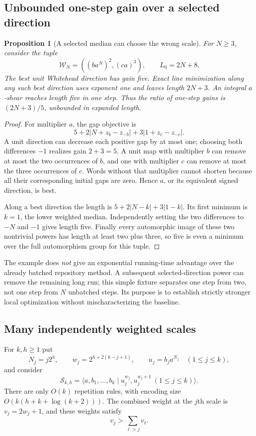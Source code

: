 \documentclass[11pt,letterpaper]{article}
\newtheorem{proposition}[theorem]{Proposition}
\theoremstyle{definition}
\theoremstyle{remark}\newtheorem{remark}[theorem]{Remark}
\newcommand{\calW}{\mathcal W}
\newcommand{\calS}{\mathcal S}
\begin{document}
\subsection{Unbounded one-step gain over a selected direction}

\begin{proposition}[A selected median can choose the wrong scale]
For $N\ge3$, consider the tuple
\[
 \calW_N=((ba^N)^2,(ca)^3),\qquad L_0=2N+8.
\]
The best unit Whitehead direction has gain five. Exact line minimization
along any such best direction uses exponent one and leaves length $2N+3$.
An integral $a$-shear reaches length five in one step. Thus the ratio of
one-step gains is $(2N+3)/5$, unbounded in expanded length.
\end{proposition}
\begin{proof}
For multiplier $a$, the gap objective is
\[
 5+2|N+z_b-z_{-b}|+3|1+z_c-z_{-c}|.
\]
A unit direction can decrease each positive gap by at most one; choosing both
differences $-1$ realizes gain $2+3=5$. A unit map with multiplier $b$ can
remove at most the two occurrences of $b$, and one with multiplier $c$ can
remove at most the three occurrences of $c$. Words without that multiplier
cannot shorten because all their corresponding initial gaps are zero.
Hence $a$, or its equivalent signed direction, is best.

Along a best direction the length is $5+2|N-k|+3|1-k|$. Its first minimum is
$k=1$, the lower weighted median. Independently setting the two differences
to $-N$ and $-1$ gives length five. Finally every automorphic image of these
two nontrivial powers has length at least two plus three, so five is even a
minimum over the full automorphism group for this tuple.
\end{proof}

The example does \emph{not} give an exponential running-time advantage over
the already batched repository method. A subsequent selected-direction power
can remove the remaining long run; this simple fixture separates one step
from two, not one step from $N$ unbatched steps. Its purpose is to establish
strictly stronger local optimization without mischaracterizing the baseline.

\subsection{Many independently weighted scales}

For $k,h\ge1$ put
\begin{equation}
 N_j=j2^h,\qquad w_j=2^{h+2(k-j+1)},\qquad
 u_j=b_ja^{N_j}\quad(1\le j\le k),
 \label{eq:starparameters}
\end{equation}
and consider
\begin{equation}
 \calS_{k,h}=\langle a,b_1,\ldots,b_k\mid
       u_j^{w_j},u_j^{w_j+1}\ (1\le j\le k)\rangle.
 \label{eq:star}
\end{equation}
There are only $O(k)$ repetition rules, with encoding size
$O(k(h+k+\log(k+2)))$. The combined weight at the $j$th scale is
$v_j=2w_j+1$, and these weights satisfy
\[
 v_j>\sum_{\ell>j}v_\ell.
\]
\end{document}
